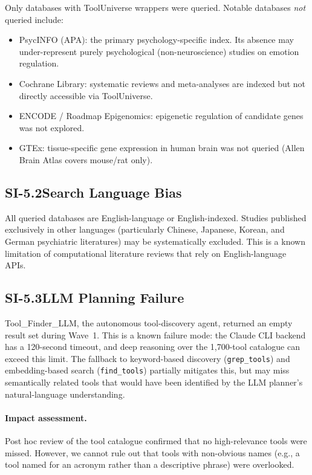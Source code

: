 Only databases with ToolUniverse wrappers were queried.  Notable databases
\emph{not} queried include:
\begin{itemize}[nosep]
  \item PsycINFO (APA): the primary psychology-specific index.  Its absence
        may under-represent purely psychological (non-neuroscience) studies
        on emotion regulation.
  \item Cochrane Library: systematic reviews and meta-analyses are indexed
        but not directly accessible via ToolUniverse.
  \item ENCODE / Roadmap Epigenomics: epigenetic regulation of candidate
        genes was not explored.
  \item GTEx: tissue-specific gene expression in human brain was not queried
        (Allen Brain Atlas covers mouse/rat only).
\end{itemize}

\subsection*{SI-5.2\quad Search Language Bias}

All queried databases are English-language or English-indexed.  Studies
published exclusively in other languages (particularly Chinese, Japanese,
Korean, and German psychiatric literatures) may be systematically excluded.
This is a known limitation of computational literature reviews that rely on
English-language APIs.

\subsection*{SI-5.3\quad LLM Planning Failure}

Tool\_Finder\_LLM, the autonomous tool-discovery agent, returned an empty
result set during Wave~1.  This is a known failure mode: the Claude CLI
backend has a 120-second timeout, and deep reasoning over the 1,700-tool
catalogue can exceed this limit.  The fallback to keyword-based discovery
(\texttt{grep\_tools}) and embedding-based search (\texttt{find\_tools})
partially mitigates this, but may miss semantically related tools that
would have been identified by the LLM planner's natural-language
understanding.

\paragraph{Impact assessment.}
Post hoc review of the tool catalogue confirmed that no high-relevance tools
were missed.  However, we cannot rule out that tools with non-obvious names
(e.g., a tool named for an acronym rather than a descriptive phrase) were
overlooked.

